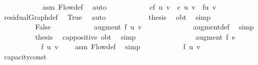 {\ \ \ \ \ \ \ \ \ \ \isamarkupfalse%
\ asm\ Flow{\isacharunderscore}def\ \isamarkupfalse%
\ auto\isanewline
\ \ \ \ \ \ \ \ \isamarkupfalse%
\ \isamarkupfalse%
\ {\isachardoublequoteopen}cf\ {\isacharparenleft}u{\isacharcomma}\ v{\isacharparenright}\ {\isacharequal}\ c\ {\isacharparenleft}u{\isacharcomma}\ v{\isacharparenright}\ {\isacharminus}\ f{\isacharparenleft}u{\isacharcomma}\ v{\isacharparenright}{\isachardoublequoteclose}\ \isanewline
\ \ \ \ \ \ \ \ \ \ \isamarkupfalse%
\ residualGraph{\isacharunderscore}def\ \isamarkupfalse%
\ True\ \isamarkupfalse%
\ auto\isanewline
\ \ \ \ \ \ \ \ \isamarkupfalse%
\ \isamarkupfalse%
\ {\isacharquery}thesis\ \isamarkupfalse%
\ obt\ \isamarkupfalse%
\ simp\isanewline
\ \ \ \ \ \ \isamarkupfalse%
\isanewline
\ \ \ \ \ \ \ \ \isamarkupfalse%
\ False\isanewline
\ \ \ \ \ \ \ \ \isamarkupfalse%
\ \isamarkupfalse%
\ {\isachardoublequoteopen}augment\ f{\isacharprime}\ {\isacharparenleft}u{\isacharcomma}\ v{\isacharparenright}\ {\isacharequal}\ {}{\isachardoublequoteclose}\isanewline
\ \ \ \ \ \ \ \ \ \ \isamarkupfalse%
\ augment{\isacharunderscore}def\ \isamarkupfalse%
\ simp\isanewline
\ \ \ \ \ \ \ \ \isamarkupfalse%
\ {\isacharquery}thesis\ \isamarkupfalse%
\ cap{\isacharunderscore}positive\ obt\ \isamarkupfalse%
\ simp\isanewline
\ \ \ \ \ \ \isamarkupfalse%
\isanewline
\ \ \ \ \isamarkupfalse%
\ \isamarkupfalse%
\ {\isachardoublequoteopen}{}\ {\isasymle}\ augment\ f{\isacharprime}\ e{\isachardoublequoteclose}\isanewline
\ \ \ \ \ \ \isamarkupfalse%
\ {\isacharminus}\isanewline
\ \ \ \ \ \ \ \ \isamarkupfalse%
\ {\isachardoublequoteopen}f{\isacharprime}\ {\isacharparenleft}u{\isacharcomma}\ v{\isacharparenright}\ {\isasymge}\ {}{\isachardoublequoteclose}\ \isamarkupfalse%
\ asm\ Flow{\isacharunderscore}def\ \isamarkupfalse%
\ simp\isanewline
\ \ \ \ \ \ \ \ \isamarkupfalse%
\ \isamarkupfalse%
\ {\isachardoublequoteopen}f\ {\isacharparenleft}u{\isacharcomma}\ v{\isacharparenright}\ {\isasymge}\ {}{\isachardoublequoteclose}\ \isamarkupfalse%
\ capacity{\isacharunderscore}const\ \isamarkupfalse%
}
